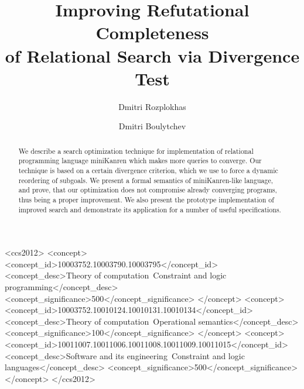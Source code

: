 \documentclass[sigconf]{acmart}
\begin{document}
\title{Improving Refutational Completeness\\
of Relational Search via Divergence Test}


\author{Dmitri Rozplokhas}

\author{Dmitri Boulytchev}


\begin{abstract}
We describe a search optimization technique for implementation of relational programming language
miniKanren which makes more queries to converge. Our technique is based on a certain 
divergence criterion, which we use to force a dynamic reordering of subgoals. We present a formal semantics of
miniKanren-like language, and prove, that our optimization does not compromise already
converging programs, thus being a proper improvement. We also present the prototype
implementation of improved search and demonstrate its application for a number of
useful specifications.
\end{abstract}

%
%
\begin{CCSXML}
<ccs2012>
<concept>
<concept_id>10003752.10003790.10003795</concept_id>
<concept_desc>Theory of computation~Constraint and logic programming</concept_desc>
<concept_significance>500</concept_significance>
</concept>
<concept>
<concept_id>10003752.10010124.10010131.10010134</concept_id>
<concept_desc>Theory of computation~Operational semantics</concept_desc>
<concept_significance>100</concept_significance>
</concept>
<concept>
<concept_id>10011007.10011006.10011008.10011009.10011015</concept_id>
<concept_desc>Software and its engineering~Constraint and logic languages</concept_desc>
<concept_significance>500</concept_significance>
</concept>
</ccs2012>
\end{CCSXML}
\end{document}
